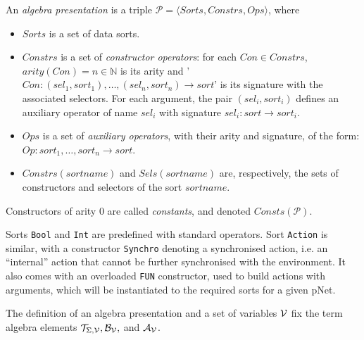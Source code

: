 \documentclass[smallcondensed]{svjour3}
\newcommand{\noteSB}[2][color=green!40, size=\tiny]{\todo[#1]{{\bf Simon: } {#2}}}
\newcommand{\cT}{\ensuremath{\mathcal{T}}}
\newcommand{\cV}{\ensuremath{\mathcal{V}}}
\newcommand{\signature}{\ensuremath{\Sigma}}
\newcommand{\variables}{\ensuremath{\cV}}
\newcommand{\Talg}{\ensuremath{\cT_{\signature,\variables}}}
\def\AlgA{\mathcal{A}}
\def\AlgB{\mathcal{B}}
\newcommand{\mdash}{---}
\begin{document}
\def\APres{\mathcal{P}}
\begin{definition}
	An \emph{algebra presentation} is a triple $\APres=\langle\mathit{Sorts},\mathit{Constrs},\mathit{Ops}\rangle$, where
	
	\begin{itemize}
		\item $Sorts$ is a set of data sorts.
		\item $\mathit{Constrs}$ is a set of \emph{constructor operators}: for each $\mathit{Con} \in \mathit{Constrs}$, $arity(Con)=n \in \mathbb{N}$ is its arity 
		and '$Con : (\mathit{sel}_1,\mathit{sort}_1), \dots, (\mathit{sel}_n,\mathit{sort}_n) \rightarrow \mathit{sort}$' is its signature with the associated selectors.
		For each argument, the pair $(\mathit{sel}_i,\mathit{sort}_i)$ defines an auxiliary
		operator of name $\mathit{sel}_i$ with signature $\mathit{sel}_i : \mathit{sort} \rightarrow \mathit{sort}_i$.
		\item $Ops$ is a set of \emph{auxiliary operators}, with their
		arity and signature, of the form: $Op : \mathit{sort}_1, \dots,  \mathit{sort}_n \rightarrow
		\mathit{sort}$.
		\item $\mathit{Constrs}(\mathit{sortname})$ and $\mathit{Sels}(\mathit{sortname})$ are, respectively, the sets of
		constructors and selectors of the sort $\mathit{sortname}$.
	\end{itemize}
	Constructors of arity 0 are called \emph{constants}, and denoted $\mathit{Consts}(\APres)$.
\end{definition}


Sorts \texttt{Bool} and \texttt{Int} are predefined with standard operators.
Sort \texttt{Action} is similar, with a constructor \texttt{Synchro} denoting
a synchronised action, i.e. an ``internal'' action that cannot be
further synchronised with the environment. It also comes with an
overloaded \texttt{FUN} constructor, used to build actions with
arguments, which will be instantiated to the required sorts for a given
pNet.

The definition of an algebra presentation and a set of variables
$\P$ fix the term algebra elements $\Talg, \AlgB_{\P},$ and $\AlgA_\P$.
\end{document}

